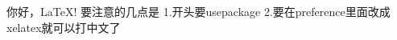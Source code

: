 \documentclass{article}
\begin{document}
你好，\LaTeX!
要注意的几点是
1.开头要usepackage
2.要在preference里面改成xelatex就可以打中文了
\end{document}
